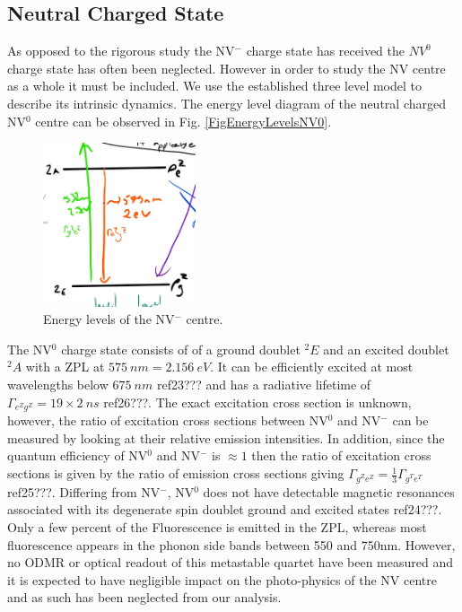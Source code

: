 \documentclass[preprint,prl,twocolumn]{revtex4}
\begin{document}
\subsection{Neutral Charged State}
As opposed to the rigorous study the NV$^-$ charge state has received the $NV^0$ charge state has often been neglected. However in order to study the NV centre as a whole it must be included. We use the established three level model to describe its intrinsic dynamics. The energy level diagram of the neutral charged NV$^0$ centre  can be observed in Fig. \ref{FigEnergyLevelsNV0}.

\begin{figure}[H]
  \centering
  \includegraphics[width=0.4\textwidth]{NV0.jpg} 
 \caption{Energy levels of the NV$^-$ centre.} \label{FigEnergyLevelsNV-}
\end{figure}

The NV$^0$ charge state consists of of a ground doublet $^2E$ and an excited doublet $^2A$ with a ZPL at $\SI{575}{nm} = \SI{2.156}{eV}$.  It can be efficiently excited at most wavelengths below $\SI{675}{nm}$ ref23??? and has a radiative lifetime of $\Gamma_{e^Zg^Z} = 19\times2 \SI{}{ns}$ ref26???. The exact excitation cross section is unknown, however, the ratio of excitation cross sections between NV$^0$ and NV$^-$ can be measured by looking at their relative emission intensities. In addition, since the quantum efficiency of NV$^0$ and NV$^-$ is $\approx 1$ then the ratio of excitation cross sections is given by the ratio of emission cross sections giving $\Gamma_{g^Ze^Z} = \frac{1}{3} \Gamma_{g^Te^T}$ ref25???. Differing from NV$^-$, NV$^0$ does not have detectable magnetic resonances associated with its degenerate spin doublet ground and excited states ref24???. Only a few percent of the Fluorescence is emitted in the ZPL, whereas most fluorescence appears in the phonon side bands between 550 and 750nm. However, no ODMR or optical readout of this metastable quartet have been measured and it is expected to have negligible impact on the photo-physics of the NV centre and as such has been neglected from our analysis. 
  
\end{document}
